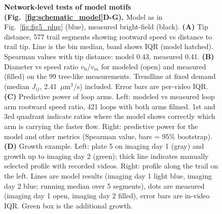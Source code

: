 \begin{figure}
    \caption{\textbf{Network-level tests of model motifs (Fig.~\ref{fig:schematic_model}D-G).}
Model as in Fig.~\ref{fig:fig5_plug} (blue), measured bright-field (black).
\textbf{(A)} Tip distance, 577 trail segments showing rootward speed vs distance to trail tip. Line is the bin median, band shows IQR (model hatched). Spearman values with tip distance: model 0.43, measured 0.41.
\textbf{(B)} Diameter vs speed ratio $v_\mathrm{b}/v_m$ for modeled (open) and measured (filled) on the 99 tree-like measurements. Trendline at fixed demand (median $J_{ij}$, 2.41~$\mu$m$^3$/s) included. Error bars are per-video IQR.
\textbf{(C)} Predictive power of loop arms. Left: modeled vs measured loop arm rootward speed ratio, 421 loops with both arms filmed. 1st and 3rd quadrant indicate ratios where the model shows correctly which arm is carrying the faster flow. Right: predictive power for the model and other metrics (Spearman value, bars = 95\% bootstrap).
\textbf{(D)} Growth example. Left: plate 5 on imaging day 1 (gray) and growth up to imaging day 2 (green); thick line indicates manually selected profile with recorded videos. Right: profile along the trail on the left. Lines are model results (imaging day 1 light blue, imaging day 2 blue; running median over 5 segments), dots are measured (imaging day 1 open, imaging day 2 filled), error bars are in-video IQR. Green box is the additional growth.}\label{fig:fig6_examples}
\end{figure}

